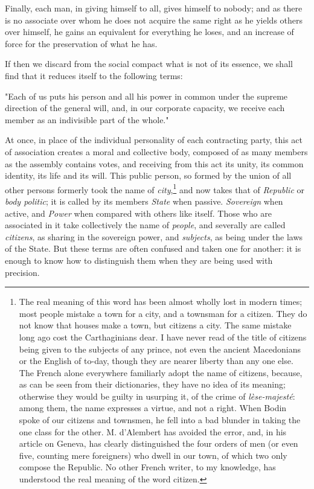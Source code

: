 \documentclass[12pt]{book}
\begin{document}
Finally, each man, in giving himself to all, gives himself to nobody; and as there is no associate over whom he does not acquire the same right as he yields others over himself, he gains an equivalent for everything he loses, and an increase of force for the preservation of what he has.

If then we discard from the social compact what is not of its essence, we shall find that it reduces itself to the following terms:
\begin{displayquote}
"Each of us puts his person and all his power in common under the supreme direction of the general will, and, in our corporate capacity, we receive each member as an indivisible part of the whole."
\end{displayquote}
At once, in place of the individual personality of each contracting party, this act of association creates a moral and collective body, composed of as many members as the assembly contains votes, and receiving from this act its unity, its common identity, its life and its will. This public person, so formed by the union of all other persons formerly took the name of \textit{city},\footnote{The real meaning of this word has been almost wholly lost in modern times; most people mistake a town for a city, and a townsman for a citizen. They do not know that houses make a town, but citizens a city. The same mistake long ago cost the Carthaginians dear. I have never read of the title of citizens being given to the subjects of any prince, not even the ancient Macedonians or the English of to-day, though they are nearer liberty than any one else. The French alone everywhere familiarly adopt the name of citizens, because, as can be seen from their dictionaries, they have no idea of its meaning; otherwise they would be guilty in usurping it, of the crime of \textit{l\`{e}se-majest\'{e}}: among them, the name expresses a virtue, and not a right. When Bodin spoke of our citizens and townsmen, he fell into a bad blunder in taking the one class for the other. M. d'Alembert has avoided the error, and, in his article on Geneva, has clearly distinguished the four orders of men (or even five, counting mere foreigners) who dwell in our town, of which two only compose the Republic. No other French writer, to my knowledge, has understood the real meaning of the word citizen.} and now takes that of \textit{Republic} or \textit{body politic}; it is called by its members \textit{State} when passive. \textit{Sovereign} when active, and \textit{Power} when compared with others like itself. Those who are associated in it take collectively the name of \textit{people}, and severally are called \textit{citizens}, as sharing in the sovereign power, and \textit{subjects}, as being under the laws of the State. But these terms are often confused and taken one for another: it is enough to know how to distinguish them when they are being used with precision.
\end{document}
